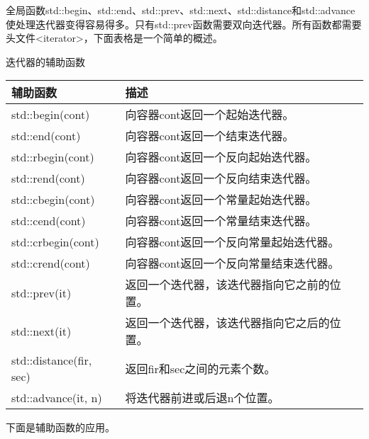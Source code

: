 全局函数std::begin、std::end、std::prev、std::next、std::distance和std::advance使处理迭代器变得容易得多。只有std::prev函数需要双向迭代器。所有函数都需要头文件<iterator>，下面表格是一个简单的概述。

\begin{center}
迭代器的辅助函数
\end{center}

\begin{longtable}[c]{|l|l|}
\hline
\textbf{辅助函数} & \textbf{描述}                                      \\ \hline
\endfirsthead
%
\endhead
%
std::begin(cont)         & 向容器cont返回一个起始迭代器。           \\ \hline
std::end(cont)           & 向容器cont返回一个结束迭代器。            \\ \hline
std::rbegin(cont)        & 向容器cont返回一个反向起始迭代器。   \\ \hline
std::rend(cont)          & 向容器cont返回一个反向结束迭代器。     \\ \hline
std::cbegin(cont)        & 向容器cont返回一个常量起始迭代器。  \\ \hline
std::cend(cont)          & 向容器cont返回一个常量结束迭代器。   \\ \hline
std::crbegin(cont)      & 向容器cont返回一个反向常量起始迭代器。 \\ \hline
std::crend(cont)        & 向容器cont返回一个反向常量结束迭代器。   \\ \hline
std::prev(it)            & 返回一个迭代器，该迭代器指向它之前的位置。 \\ \hline
std::next(it)            & 返回一个迭代器，该迭代器指向它之后的位置。 \\ \hline
std::distance(fir, sec) & 返回fir和sec之间的元素个数。              \\ \hline
std::advance(it, n)      & 将迭代器前进或后退n个位置。                 \\ \hline
\end{longtable}

下面是辅助函数的应用。



